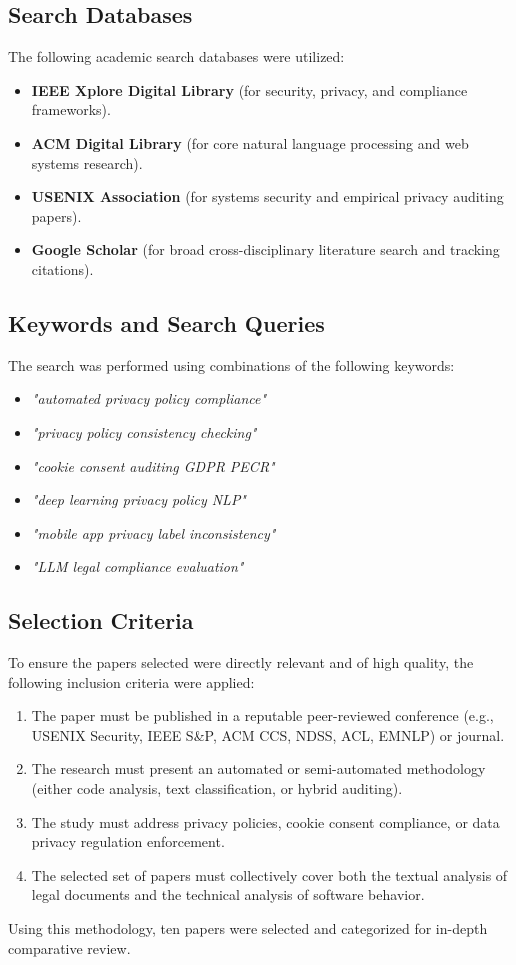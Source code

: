 \documentclass[11pt,a4paper]{article}
\begin{document}
\subsection{Search Databases}
The following academic search databases were utilized:
\begin{itemize}
    \item \textbf{IEEE Xplore Digital Library} (for security, privacy, and compliance frameworks).
    \item \textbf{ACM Digital Library} (for core natural language processing and web systems research).
    \item \textbf{USENIX Association} (for systems security and empirical privacy auditing papers).
    \item \textbf{Google Scholar} (for broad cross-disciplinary literature search and tracking citations).
\end{itemize}

\subsection{Keywords and Search Queries}
The search was performed using combinations of the following keywords:
\begin{itemize}
    \item \textit{"automated privacy policy compliance"}
    \item \textit{"privacy policy consistency checking"}
    \item \textit{"cookie consent auditing GDPR PECR"}
    \item \textit{"deep learning privacy policy NLP"}
    \item \textit{"mobile app privacy label inconsistency"}
    \item \textit{"LLM legal compliance evaluation"}
\end{itemize}

\subsection{Selection Criteria}
To ensure the papers selected were directly relevant and of high quality, the following inclusion criteria were applied:
\begin{enumerate}
    \item The paper must be published in a reputable peer-reviewed conference (e.g., USENIX Security, IEEE S\&P, ACM CCS, NDSS, ACL, EMNLP) or journal.
    \item The research must present an automated or semi-automated methodology (either code analysis, text classification, or hybrid auditing).
    \item The study must address privacy policies, cookie consent compliance, or data privacy regulation enforcement.
    \item The selected set of papers must collectively cover both the textual analysis of legal documents and the technical analysis of software behavior.
\end{enumerate}
Using this methodology, ten papers were selected and categorized for in-depth comparative review.
\end{document}
